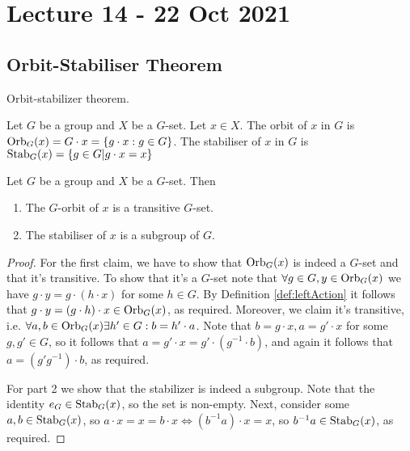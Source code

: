 \section{Lecture 14 - 22 Oct 2021}
\subsection{Orbit-Stabiliser Theorem}
Orbit-stabilizer theorem.
\begin{definition}
  Let $G$ be a group and $X$ be a $G$-set. Let $x\in X$. The orbit of $x$ in $G$ is
  $\operatorname*{Orb}_G (x)= G\cdot x = \left\{ g\cdot x :g\in G\right\}$.
  The stabiliser of $x$ in $G$ is $\operatorname*{Stab}_G (x)=\left\{ g\in G | g\cdot x=x \right\}$
  \label{def:orbStab}
\end{definition}


\begin{theorem}
  Let $G$ be a group and $X$ be a $G$-set. Then 
  \begin{enumerate}
    \item The $G$-orbit of $x$ is a transitive $G$-set.
    \item The stabiliser of $x$ is a subgroup of $G$.
  \end{enumerate}
  \label{<+label+>}
\end{theorem}
\begin{proof}
  For the first claim, we have to show that $\operatorname*{Orb}_G(x)$ is indeed a $G$-set and that it's
  transitive. To show that it's a $G$-set note that $\forall g\in G, y\in\operatorname*{Orb}_G(x)$ we
  have $g\cdot y = g\cdot (h\cdot x)$ for some $h\in G$. By Definition
  \ref{def:leftAction} it follows that $g\cdot y = (g\cdot h)\cdot x \in\operatorname*{Orb}_G(x)$, as
  required. Moreover, we claim it's transitive, i.e. $\forall a,b\in\operatorname*{Orb}_G(x)\exists h'\in
  G : b=h'\cdot a$. Note that $b=g\cdot x, a=g'\cdot x$ for some $g,g'\in G$, so it
  follows that $a=g'\cdot x = g'\cdot (g^{-1}\cdot b)$, and again it follows that
  $a=(g'g^{-1})\cdot b$, as required.

  For part 2 we show that the stabilizer is indeed a subgroup. Note that the identity
  $e_G\in\operatorname*{Stab}_G(x)$, so the set is non-empty. Next, consider some $a,b\in\operatorname*{Stab}_G(x)$, so
  $a\cdot x=x=b\cdot x \iff (b^{-1}a)\cdot x =x$, so $b^{-1}a\in\operatorname*{Stab}_G(x)$, as required.
\end{proof}


